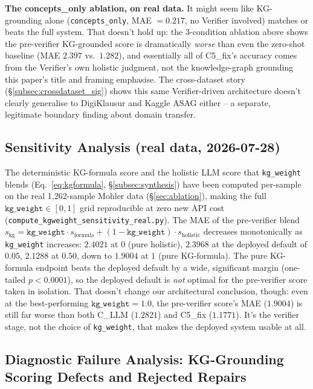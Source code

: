 \documentclass[conference]{IEEEtran}
\begin{document}
\textbf{The concepts\_only ablation, on real data.} It might seem like
KG-grounding alone (\texttt{concepts\_only}, MAE $=0.217$, no Verifier
involved) matches or beats the full system. That doesn't hold up: the
3-condition ablation above shows the pre-verifier KG-grounded score is
dramatically \emph{worse} than even the zero-shot baseline (MAE
$2.397$ vs.\ $1.282$), and essentially all of C5\_fix's accuracy comes
from the Verifier's own holistic judgment, not the knowledge-graph
grounding this paper's title and framing emphasise. The cross-dataset
story (\S\ref{subsec:crossdataset_sig}) shows this same
Verifier-driven architecture doesn't clearly generalise to
DigiKlausur and Kaggle ASAG either -- a separate, legitimate boundary
finding about domain transfer.


\subsection{Sensitivity Analysis (real data, 2026-07-28)}

The deterministic KG-formula score and the holistic LLM score that
\texttt{kg\_weight} blends (Eq.~\ref{eq:kgformula}, \S\ref{subsec:synthesis})
have been computed per-sample on the real 1{,}262-sample Mohler data
(\S\ref{sec:ablation}), making the full $\texttt{kg\_weight}\in[0,1]$
grid reproducible at zero new API cost
(\texttt{compute\_kgweight\_sensitivity\_real.py}). The MAE of the
pre-verifier blend $s_{\text{kg}} = \texttt{kg\_weight}\cdot
s_{\text{formula}} + (1-\texttt{kg\_weight})\cdot s_{\text{holistic}}$
decreases monotonically as \texttt{kg\_weight} increases: $2.4021$ at
$0$ (pure holistic), $2.3968$ at the deployed default of $0.05$,
$2.1288$ at $0.50$, down to $1.9004$ at $1$ (pure KG-formula). The
pure KG-formula endpoint beats the deployed default by a wide,
significant margin (one-tailed $p<0.0001$), so the deployed default
is \emph{not} optimal for the pre-verifier score taken in isolation.
That doesn't change our architectural conclusion, though: even at the
best-performing $\texttt{kg\_weight}=1.0$, the pre-verifier score's
MAE ($1.9004$) is still far worse than both C\_LLM ($1.2821$) and
C5\_fix ($1.1771$). It's the verifier stage, not the choice of
\texttt{kg\_weight}, that makes the deployed system usable at all.

\subsection{Diagnostic Failure Analysis: KG-Grounding Scoring Defects and Rejected Repairs}
\label{subsec:diagnostic_failure}
\end{document}
